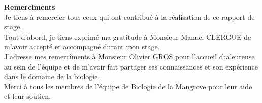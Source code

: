 \vspace*{\fill}
    \begin{center}
        \textbf{\large{Remerciments}} \\[2cm]
        Je tiens à remercier tous ceux qui ont contribué à la réalisation de ce rapport de stage. \\[0.5cm]

        Tout d'abord, je tiens exprimé ma gratitude à Monsieur Manuel CLERGUE de m'avoir accepté et accompagné durant mon stage. \\[0.5cm]

        J'adresse mes remercîments à Monsieur Olivier GROS pour l'accueil chaleureuse au sein de l'équipe et de m'avoir fait partager ses connaissances et son expérience dans le domaine de la biologie. \\[0.5cm]

        Merci à tous les membres de l'équipe de Biologie de la Mangrove pour leur aide et leur soutien. \\[0.5cm]
    \end{center}
\vspace*{\fill}